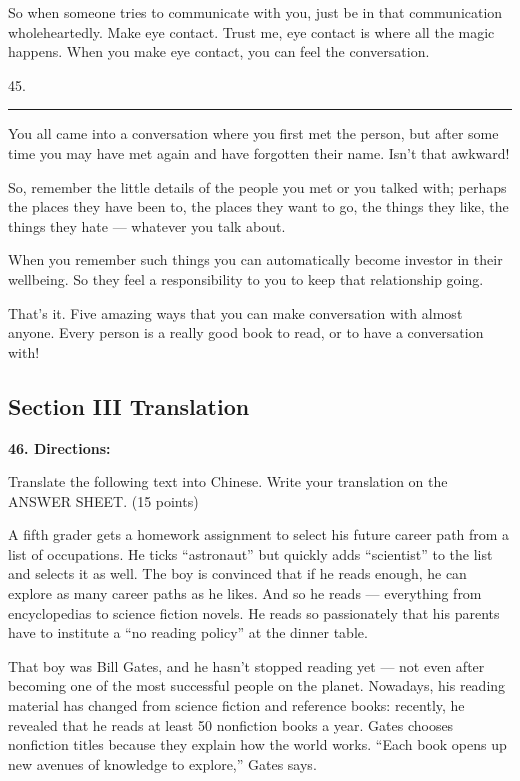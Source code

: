 \documentclass[UTF8,11pt]{ctexart}
\begin{document}
So when someone tries to communicate with you, just be in that communication wholeheartedly. Make eye contact. Trust me, eye contact is where all the magic happens. When you make eye contact, you can feel the conversation.


45. \par\noindent\rule{.95\linewidth}{.4pt}\par


You all came into a conversation where you first met the person, but after some time you may have met again and have forgotten their name. Isn’t that awkward!


So, remember the little details of the people you met or you talked with; perhaps the places they have been to, the places they want to go, the things they like, the things they hate — whatever you talk about.


When you remember such things you can automatically become investor in their wellbeing. So they feel a responsibility to you to keep that relationship going.


That’s it. Five amazing ways that you can make conversation with almost anyone. Every person is a really good book to read, or to have a conversation with!


\subsection*{\textbf{Section III Translation}}


\textbf{46. Directions:}


Translate the following text into Chinese. Write your translation on the ANSWER SHEET. (15 points)


A fifth grader gets a homework assignment to select his future career path from a list of occupations. He ticks “astronaut” but quickly adds “scientist” to the list and selects it as well. The boy is convinced that if he reads enough, he can explore as many career paths as he likes. And so he reads — everything from encyclopedias to science fiction novels. He reads so passionately that his parents have to institute a “no reading policy” at the dinner table.


That boy was Bill Gates, and he hasn’t stopped reading yet — not even after becoming one of the most successful people on the planet. Nowadays, his reading material has changed from science fiction and reference books: recently, he revealed that he reads at least 50 nonfiction books a year. Gates chooses nonfiction titles because they explain how the world works. “Each book opens up new avenues of knowledge to explore,” Gates says.
\end{document}
